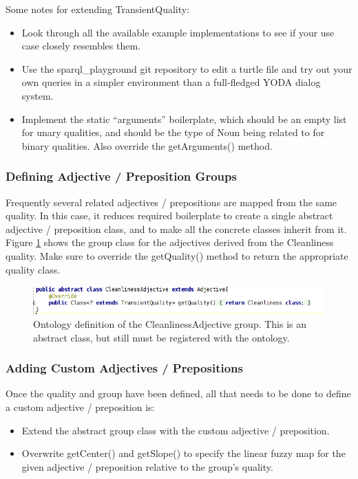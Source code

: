 \documentclass[titlepage]{article}
\begin{document}
\noindent Some notes for extending TransientQuality:
\begin{itemize}
\item Look through all the available example implementations to see if your use case closely resembles them.
\item Use the sparql\_playground git repository to edit a turtle file and try out your own queries in a simpler environment than a full-fledged YODA dialog system.
\item Implement the static ``arguments'' boilerplate, which should be an empty list for unary qualities, and should be the type of Noun being related to for binary qualities. Also override the getArguments() method.
\end{itemize}


\subsubsection{Defining Adjective / Preposition Groups}

Frequently several related adjectives / prepositions are mapped from the same quality.
In this case, it reduces required boilerplate to create a single abstract adjective / preposition class, and to make all the concrete classes inherit from it.
Figure \ref{fig:group_abstract_adjective} shows the group class for the adjectives derived from the Cleanliness quality.
Make sure to override the getQuality() method to return the appropriate quality class.

\begin{figure}[h!]
\centering
\includegraphics[width=\textwidth]{GroupAbstractAdjective}
\caption{Ontology definition of the CleanlinessAdjective group.
This is an abstract class, but still must be registered with the ontology.}
\label{fig:group_abstract_adjective}
\end{figure}


\subsubsection{Adding Custom Adjectives / Prepositions}

Once the quality and group have been defined, all that needs to be done to define a custom adjective / preposition is:
\begin{itemize}
\item Extend the abstract group class with the custom adjective / preposition.
\item Overwrite getCenter() and getSlope() to specify the linear fuzzy map for the given adjective / preposition relative to the group's quality.
\end{itemize}
\end{document}
